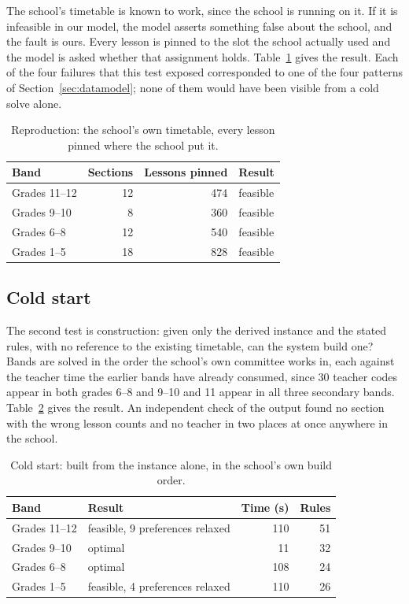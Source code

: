 The school's timetable is known to work, since the school is running on it. If it is infeasible in
our model, the model asserts something false about the school, and the fault is ours. Every lesson
is pinned to the slot the school actually used and the model is asked whether that assignment
holds. Table~\ref{tab:reproduction} gives the result. Each of the four failures that this test
exposed corresponded to one of the four patterns of Section~\ref{sec:datamodel}; none of them
would have been visible from a cold solve alone.

\begin{table}[ht]
\centering
\caption{Reproduction: the school's own timetable, every lesson pinned where the school put it.}
\label{tab:reproduction}
\begin{tabular}{lrrl}
\toprule
Band & Sections & Lessons pinned & Result \\
\midrule
Grades 11--12 & 12 & 474 & feasible \\
Grades 9--10  &  8 & 360 & feasible \\
Grades 6--8   & 12 & 540 & feasible \\
Grades 1--5   & 18 & 828 & feasible \\
\bottomrule
\end{tabular}
\end{table}

\subsection{Cold start}

The second test is construction: given only the derived instance and the stated rules, with no
reference to the existing timetable, can the system build one? Bands are solved in the order the
school's own committee works in, each against the teacher time the earlier bands have already
consumed, since 30 teacher codes appear in both grades 6--8 and 9--10 and 11 appear in all three
secondary bands. Table~\ref{tab:coldstart} gives the result. An independent check of the output
found no section with the wrong lesson counts and no teacher in two places at once anywhere in the
school.

\begin{table}[ht]
\centering
\caption{Cold start: built from the instance alone, in the school's own build order.}
\label{tab:coldstart}
\begin{tabular}{llrr}
\toprule
Band & Result & Time (s) & Rules \\
\midrule
Grades 11--12 & feasible, 9 preferences relaxed & 110 & 51 \\
Grades 9--10  & optimal                         &  11 & 32 \\
Grades 6--8   & optimal                         & 108 & 24 \\
Grades 1--5   & feasible, 4 preferences relaxed & 110 & 26 \\
\bottomrule
\end{tabular}
\end{table}

